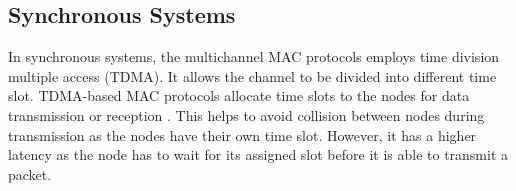 





\subsection{Synchronous Systems}
In synchronous systems, the multichannel MAC protocols employs time division multiple access (TDMA). It allows the channel to be divided into different time slot. TDMA-based MAC protocols allocate time slots to the nodes for data transmission or reception \cite{y-mac}. This helps to avoid collision between nodes during transmission as the nodes have their own time slot. However, it has a higher latency as the node has to wait for its assigned slot before it is able to transmit a packet. 

